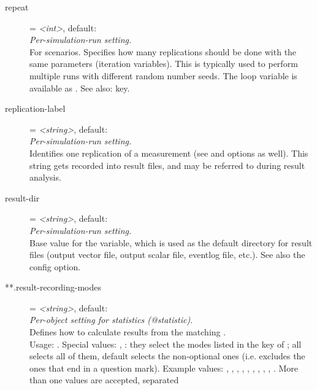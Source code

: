 \begin{description}
\item[repeat] = \textit{<int>}, default: \\
    \textit{Per-simulation-run setting.}\\
    For scenarios. Specifies how many replications should be done with the same
    parameters (iteration variables). This is typically used to perform
    multiple runs with different random number seeds. The loop variable is
    available as . See also:
     key.
\item[replication-label] = \textit{<string>}, default: \\
    \textit{Per-simulation-run setting.}\\
    Identifies one replication of a measurement (see  and
     options as well). This string gets
    recorded into result files, and may be referred to during result analysis.
\item[result-dir] = \textit{<string>}, default: \\
    \textit{Per-simulation-run setting.}\\
    Base value for the 
    variable, which is used as the default directory for result files (output
    vector file, output scalar file, eventlog file, etc.). See also the
     config option.
\item[**.result-recording-modes] = \textit{<string>}, default: \\
    \textit{Per-object setting for statistics (@statistic).}\\
    Defines how to calculate results from the matching
    .\\
    Usage:
    .
    Special values: , : they select the modes listed in
    the  key of ; all selects all of
    them, default selects the non-optional ones (i.e. excludes the ones that
    end in a question mark). Example values: , ,
    , , , , , ,
    , . More than one values are accepted, separated

\end{description}
